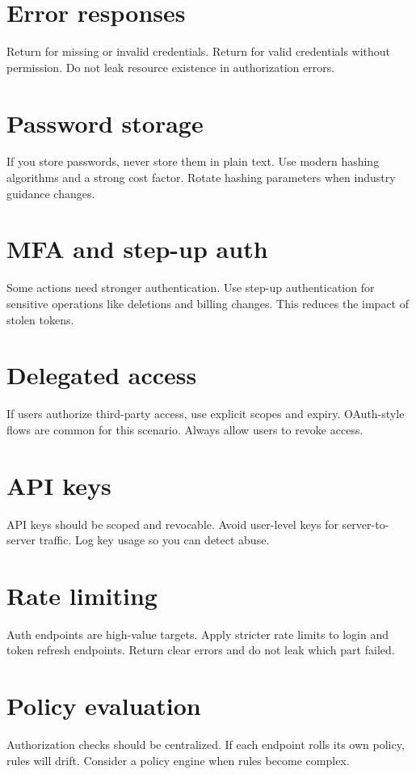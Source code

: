 \section{Error responses}
Return  for missing or invalid credentials.
Return  for valid credentials without permission.
Do not leak resource existence in authorization errors.

\section{Password storage}
If you store passwords, never store them in plain text.
Use modern hashing algorithms and a strong cost factor.
Rotate hashing parameters when industry guidance changes.

\section{MFA and step-up auth}
Some actions need stronger authentication.
Use step-up authentication for sensitive operations like deletions and billing changes.
This reduces the impact of stolen tokens.

\section{Delegated access}
If users authorize third-party access, use explicit scopes and expiry.
OAuth-style flows are common for this scenario.
Always allow users to revoke access.

\section{API keys}
API keys should be scoped and revocable.
Avoid user-level keys for server-to-server traffic.
Log key usage so you can detect abuse.

\section{Rate limiting}
Auth endpoints are high-value targets.
Apply stricter rate limits to login and token refresh endpoints.
Return clear errors and do not leak which part failed.

\section{Policy evaluation}
Authorization checks should be centralized.
If each endpoint rolls its own policy, rules will drift.
Consider a policy engine when rules become complex.

